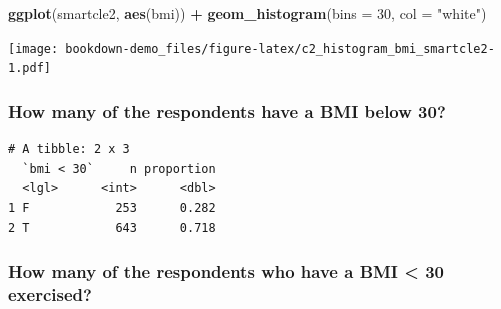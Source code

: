 \documentclass[]{book}
\newenvironment{Shaded}{\begin{snugshade}}{\end{snugshade}}
\newcommand{\KeywordTok}[1]{\textcolor[rgb]{0.13,0.29,0.53}{\textbf{#1}}}
\newcommand{\DataTypeTok}[1]{\textcolor[rgb]{0.13,0.29,0.53}{#1}}
\newcommand{\DecValTok}[1]{\textcolor[rgb]{0.00,0.00,0.81}{#1}}
\newcommand{\StringTok}[1]{\textcolor[rgb]{0.31,0.60,0.02}{#1}}
\newcommand{\OperatorTok}[1]{\textcolor[rgb]{0.81,0.36,0.00}{\textbf{#1}}}
\newcommand{\NormalTok}[1]{#1}
\theoremstyle{definition}
\theoremstyle{definition}
\theoremstyle{definition}
\theoremstyle{remark}
\begin{document}
\begin{Shaded}
\begin{Highlighting}[]
\KeywordTok{ggplot}\NormalTok{(smartcle2, }\KeywordTok{aes}\NormalTok{(bmi)) }\OperatorTok{+}
\StringTok{    }\KeywordTok{geom_histogram}\NormalTok{(}\DataTypeTok{bins =} \DecValTok{30}\NormalTok{, }\DataTypeTok{col =} \StringTok{"white"}\NormalTok{)}
\end{Highlighting}
\end{Shaded}

\texttt{[image: bookdown-demo\_files/figure-latex/c2\_histogram\_bmi\_smartcle2-1.pdf]}

\subsubsection{How many of the respondents have a BMI below
30?}\label{how-many-of-the-respondents-have-a-bmi-below-30}

\begin{Shaded}
\end{Shaded}

\begin{verbatim}
# A tibble: 2 x 3
  `bmi < 30`     n proportion
  <lgl>      <int>      <dbl>
1 F            253      0.282
2 T            643      0.718
\end{verbatim}

\subsubsection{How many of the respondents who have a BMI \textless{} 30
exercised?}\label{how-many-of-the-respondents-who-have-a-bmi-30-exercised}

\begin{Shaded}
\end{Shaded}
\end{document}

